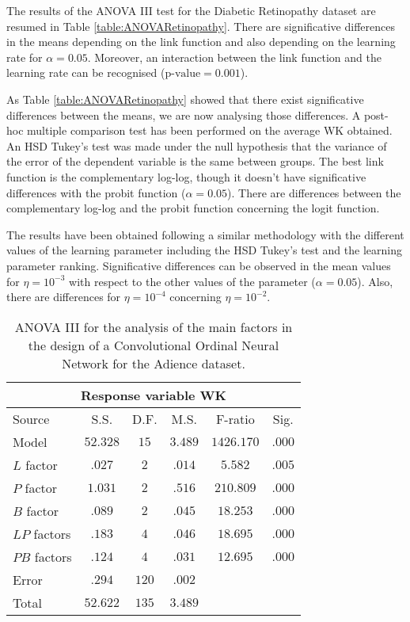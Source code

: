 \documentclass[10pt, a4paper, titlepage, twocolumn]{article}
\begin{document}
	The results of the ANOVA III test for the Diabetic Retinopathy dataset are resumed in Table \ref{table:ANOVARetinopathy}. There are significative differences in the means depending on the link function and also depending on the learning rate for $\alpha=0.05$. Moreover, an interaction between the link function and the learning rate can be recognised ($\text{p-value} = 0.001$).
	
	As Table \ref{table:ANOVARetinopathy} showed that there exist significative differences between the means, we are now analysing those differences. A post-hoc multiple comparison test has been performed on the average WK obtained. An HSD Tukey's test was made under the null hypothesis that the variance of the error of the dependent variable is the same between groups. The best link function is the complementary log-log, though it doesn't have significative differences with the probit function ($\alpha=0.05$). There are differences between the complementary log-log and the probit function concerning the logit function.
	
	The results have been obtained following a similar methodology with the different values of the learning parameter including the HSD Tukey's test and the learning parameter ranking. Significative differences can be observed in the mean values for $\eta = 10^{-3}$ with respect to the other values of the parameter ($\alpha=0.05$). Also, there are differences for $\eta = 10^{-4}$ concerning $\eta = 10^{-2}$.
	
	\begin{table}[htbp]
		\centering
		\small
		\begin{tabular}{l|ccccc}
			\multicolumn{6}{c}{Response variable WK}\\\hline
			Source & S.S. & D.F. & M.S. & F-ratio & Sig.\\\hline
			Model & $52.328$ & $15$ & $3.489$ & $1426.170$ & $.000$\\
			$L$ factor & $.027$ & $2$ & $.014$ & $5.582$ & $.005$\\
			$P$ factor & $1.031$ & $2$ & $.516$ & $210.809$ & $.000$\\
			$B$ factor & $.089$ & $2$ & $.045$ & $18.253$ & $.000$\\
			$LP$ factors & $.183$ & $4$ & $.046$ & $18.695$ & $.000$\\
			$PB$ factors & $.124$ & $4$ & $.031$ & $12.695$ & $.000$\\
			Error & $.294$ & $120$ & $.002$ & & \\
			Total & $52.622$ & $135$ & $3.489$ & & 
		\end{tabular}
		\caption{ANOVA III for the analysis of the main factors in the design of a Convolutional Ordinal Neural Network for the Adience dataset.}
		\label{table:ANOVAAdience}
	\end{table}
	
\end{document}
